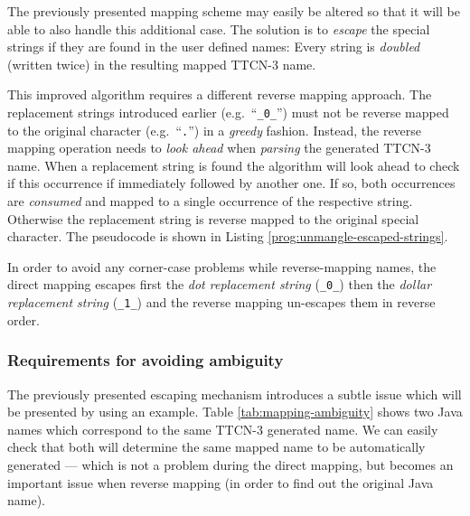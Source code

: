 The previously presented mapping scheme may easily be altered
so that it will be able to also handle this additional case.
The solution is to \emph{escape} the special strings
if they are found in the user defined names:
Every string is \emph{doubled} (written twice)
in the resulting mapped \ac{TTCN-3} name.

This improved algorithm requires a different reverse mapping approach.
The replacement strings introduced earlier (e.g.\ ``\verb=_0_='')
must not be reverse mapped to the original character (e.g.\ ``\verb=.='')
in a \emph{greedy} fashion.
Instead, the reverse mapping operation needs to \emph{look ahead}
when \emph{parsing} the generated \ac{TTCN-3} name.
When a replacement string is found the algorithm will look ahead
to check if this occurrence if immediately followed by another one.
If so, both occurrences are \emph{consumed}
and mapped to a single occurrence of the respective string.
Otherwise the replacement string is reverse mapped to
the original special character.
The pseudocode is shown in Listing \ref{prog:unmangle-escaped-strings}.

\begin{program}
\caption{Pseudocode for unmangling special characters %
	and checking for escaped replacement strings%
	\label{prog:unmangle-escaped-strings}}
\end{program}

In order to avoid any corner-case problems while reverse-mapping names,
the direct mapping escapes first the \emph{dot replacement string} (\verb=_0_=)
then the \emph{dollar replacement string} (\verb=_1_=)
and the reverse mapping un-escapes them in reverse order.


\subsubsection{Requirements for avoiding ambiguity}
\label{sec:avoiding-ambiguity}

The previously presented escaping mechanism introduces a subtle issue
which will be presented by using an example.
Table \ref{tab:mapping-ambiguity} shows two Java names which correspond
to the same \ac{TTCN-3} generated name.
We can easily check that both will determine the same mapped name
to be automatically generated ---
which is not a problem during the direct mapping,
but becomes an important issue when reverse mapping
(in order to find out the original Java name).

